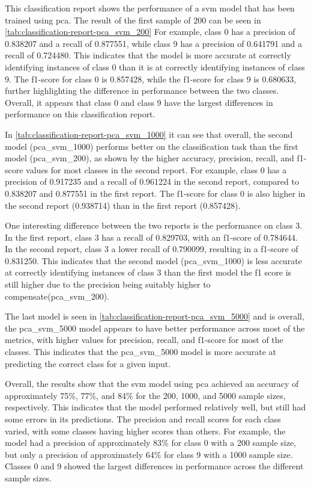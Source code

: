 This classification report shows the performance of a \gls{svm} model that has been trained using \gls{pca}. The result of the first sample of 200 can be seen in \ref{tab:classification-report-pca_svm_200}
For example, class 0 has a precision of 0.838207 and a recall of 0.877551, while class 9 has a precision of 0.641791 and a recall of 0.724480. This indicates that the model is more accurate at correctly identifying instances of class 0 than it is at correctly identifying instances of class 9. The f1-score for class 0 is 0.857428, while the f1-score for class 9 is 0.680633, further highlighting the difference in performance between the two classes. Overall, it appears that class 0 and class 9 have the largest differences in performance on this classification report.



In \ref{tab:classification-report-pca_svm_1000} it can see that overall, the second model (pca\_svm\_1000) performs better on the classification task than the first model (pca\_svm\_200), as shown by the higher accuracy, precision, recall, and f1-score values for most classes in the second report. For example, class 0 has a precision of 0.917235 and a recall of 0.961224 in the second report, compared to 0.838207 and 0.877551 in the first report. The f1-score for class 0 is also higher in the second report (0.938714) than in the first report (0.857428).

One interesting difference between the two reports is the performance on class 3. In the first report, class 3 has a recall of 0.829703, with an f1-score of 0.784644. In the second report, class 3 a lower recall of 0.790099, resulting in a f1-score of 0.831250. This indicates that the second model (pca\_svm\_1000) is less accurate at correctly identifying instances of class 3 than the first model the f1 score is still higher due to the precision being suitably higher to compensate(pca\_svm\_200).

The last model is seen in \ref{tab:classification-report-pca_svm_5000} and is overall, the pca\_svm\_5000 model appears to have better performance across most of the metrics, with higher values for precision, recall, and f1-score for most of the classes. This indicates that the pca\_svm\_5000 model is more accurate at predicting the correct class for a given input.




Overall, the results show that the \gls{svm} model using \gls{pca} achieved an accuracy of approximately 75\%, 77\%, and 84\% for the 200, 1000, and 5000 sample sizes, respectively. This indicates that the model performed relatively well, but still had some errors in its predictions. The precision and recall scores for each class varied, with some classes having higher scores than others. For example, the model had a precision of approximately 83\% for class 0 with a 200 sample size, but only a precision of approximately 64\% for class 9 with a 1000 sample size. Classes 0 and 9 showed the largest differences in performance across the different sample sizes.

